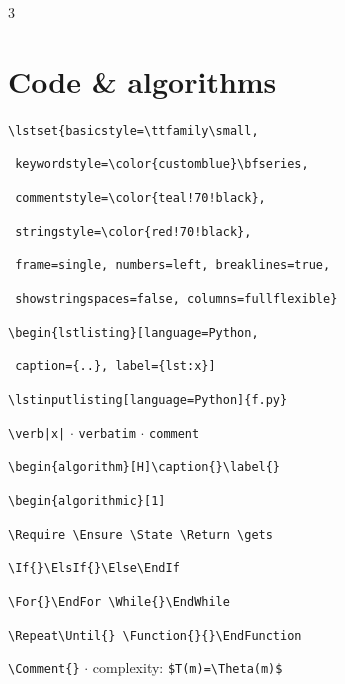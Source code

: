\documentclass[a4paper]{article}
\newcommand{\C}[1]{\texttt{\footnotesize #1}}
\begin{document}
{\begin{multicols}{3}
\section{Code \& algorithms}
\C{\textbackslash lstset\{basicstyle=\textbackslash ttfamily\textbackslash small,}\par
\C{ keywordstyle=\textbackslash color\{customblue\}\textbackslash bfseries,}\par
\C{ commentstyle=\textbackslash color\{teal!70!black\},}\par
\C{ stringstyle=\textbackslash color\{red!70!black\},}\par
\C{ frame=single, numbers=left, breaklines=true,}\par
\C{ showstringspaces=false, columns=fullflexible\}}\par
\C{\textbackslash begin\{lstlisting\}[language=Python,}\par
\C{ caption=\{..\}, label=\{lst:x\}]}\par
\C{\textbackslash lstinputlisting[language=Python]\{f.py\}}\par
\C{\textbackslash verb|x|} $\cdot$ \C{verbatim} $\cdot$ \C{comment}\par
\C{\textbackslash begin\{algorithm\}[H]\textbackslash caption\{\}\textbackslash label\{\}}\par
\C{\textbackslash begin\{algorithmic\}[1]}\par
\C{\textbackslash Require \textbackslash Ensure \textbackslash State \textbackslash Return \textbackslash gets}\par
\C{\textbackslash If\{\}\textbackslash ElsIf\{\}\textbackslash Else\textbackslash EndIf}\par
\C{\textbackslash For\{\}\textbackslash EndFor \textbackslash While\{\}\textbackslash EndWhile}\par
\C{\textbackslash Repeat\textbackslash Until\{\} \textbackslash Function\{\}\{\}\textbackslash EndFunction}\par
\C{\textbackslash Comment\{\}} $\cdot$ complexity: \C{\$T(m)=\textbackslash Theta(m)\$}


\end{multicols}}
\end{document}
